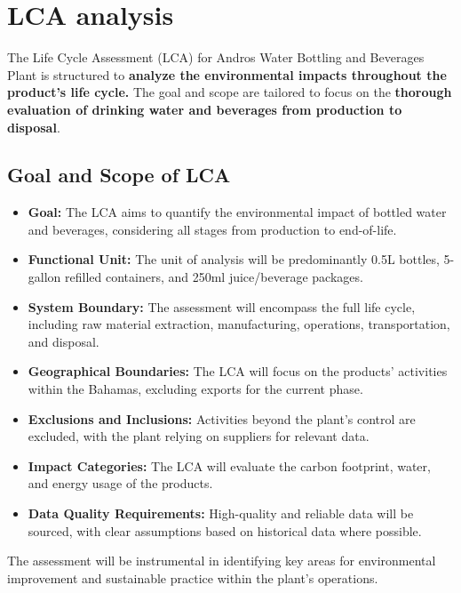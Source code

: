 \documentclass{article}
\begin{document}
\section{LCA analysis}
The Life Cycle Assessment (LCA) for Andros Water Bottling and Beverages Plant is structured to \textbf{analyze the environmental impacts throughout the product's life cycle.} The goal and scope are tailored to focus on the \textbf{thorough evaluation of drinking water and beverages from production to disposal}.

\subsection{Goal and Scope of LCA}
\begin{itemize}
  \item \textbf{Goal:} The LCA aims to quantify the environmental impact of bottled water and beverages, considering all stages from production to end-of-life.
  \item \textbf{Functional Unit:} The unit of analysis will be predominantly 0.5L bottles, 5-gallon refilled containers, and 250ml juice/beverage packages.
  \item \textbf{System Boundary:} The assessment will encompass the full life cycle, including raw material extraction, manufacturing, operations, transportation, and disposal.
  \item \textbf{Geographical Boundaries:} The LCA will focus on the products' activities within the Bahamas, excluding exports for the current phase.
  \item \textbf{Exclusions and Inclusions:} Activities beyond the plant's control are excluded, with the plant relying on suppliers for relevant data.
  \item \textbf{Impact Categories:} The LCA will evaluate the carbon footprint, water, and energy usage of the products.
  \item \textbf{Data Quality Requirements:} High-quality and reliable data will be sourced, with clear assumptions based on historical data where possible.
\end{itemize}

The assessment will be instrumental in identifying key areas for environmental improvement and sustainable practice within the plant's operations.
\end{document}

